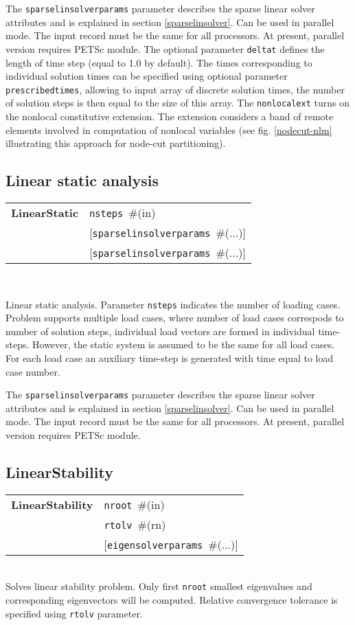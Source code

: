 \documentclass[a4paper]{report}
\newcommand{\param}[1]{\texttt{#1}} %
\newcommand{\optional}[1]{[#1]} %
\newcommand{\field}[2]{\param{#1}~\#{\tiny(#2)}} %
\newcommand{\optField}[2]{\optional{\field{#1}{#2}}}
\newcommand{\entKeywordInst}[1]{\textbf{#1}} %
\newcommand{\missing}[1]{}
\newcommand{\Pmode}[1]{{\sffamily #1}}
\newenvironment{record}[1][]{\begin{tabular}{|ll}}{\end{tabular}\\}
\newcommand{\recentry}[2]{{#1}&{#2}\\}
\newcounter{rcc}
\newenvironment{record}[1][\textwidth]{\setcounter{rcc}{0}\rowcolors{1}{lightgray}{lightgray}\tabularx{#1}{llR} \hline}
               {\endtabularx}
\newcommand{\recentry}[2]{\ifthenelse{\value{rcc}>0}{$\backslash$ \\}{\setcounter{rcc}{1}}{#1}&{#2}&}
\begin{document}
The  \param{sparselinsolverparams} parameter describes the sparse
linear solver attributes and is explained in section \ref{sparselinsolver}.
\Pmode{Can be used in parallel mode. The input record must be the same
 for all processors. At present, parallel version requires PETSc module.}
The optional parameter \param{deltat} defines the length of time step (equal to 1.0 by default). The times corresponding to individual solution times can be specified using optional parameter \param{prescribedtimes}, allowing to input array of discrete solution times, the number of solution steps is then equal to the size of this array. 
\Pmode{The \param{nonlocalext} turns on the nonlocal constitutive
extension. The extension considers a band of remote elements involved
in computation of nonlocal variables (see fig. \ref{nodecut-nlm} illustrating
this approach for node-cut partitioning)}.

\missing{Metasteps support}

\subsection{Linear static analysis}
\label{LinearStatic}
\begin{record}
  \recentry{\entKeywordInst{LinearStatic}}{\field{nsteps}{in}}
  \recentry{}{\optField{sparselinsolverparams}{...}}
  \recentry{}{\optField{sparselinsolverparams}{...}}
\end{record}

Linear static analysis.
Parameter \param{nsteps} indicates the number of loading cases.
Problem supports multiple load cases, where number of load cases correspods to number of solution steps, individual load vectors are formed in individual time-steps.
However, the static system is assumed to be the same for all load cases. For each load case an auxiliary time-step is generated with time equal to load case number.

The  \param{sparselinsolverparams} parameter describes the sparse
linear solver attributes and is explained in section \ref{sparselinsolver}.
\Pmode{Can be used in parallel mode. The input record must be the same
for all processors. At present, parallel version requires PETSc module.}


\subsection{LinearStability}
\label{LinearStability}
\begin{record}
  \recentry{\entKeywordInst{LinearStability}}{\field{nroot}{in}}
  \recentry{}{\field{rtolv}{rn}}
  \recentry{}{\optField{eigensolverparams}{...}}
\end{record}
Solves linear stability problem. Only first \param{nroot} smallest
eigenvalues and corresponding eigenvectors will be computed.
Relative convergence tolerance is specified using \param{rtolv} parameter.
\end{document}

